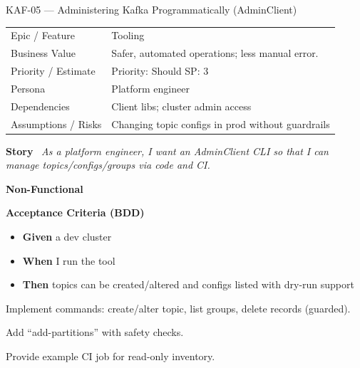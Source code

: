 \documentclass[11pt,a4paper]{article}
\newcommand{\Field}[2]{\textbf{#1}~#2}
\begin{document}
\begin{StoryCardBox}{KAF-05 --- Administering Kafka Programmatically (AdminClient)}
\begin{tabularx}{\linewidth}{LY}
 Epic / Feature & Tooling \\
 Business Value & Safer, automated operations; less manual error. \\
 Priority / Estimate & Priority: Should \quad SP: 3 \\
 Persona & Platform engineer \\
 Dependencies & Client libs; cluster admin access \\
 Assumptions / Risks & Changing topic configs in prod without guardrails \\
\end{tabularx}

\medskip
\Field{Story}{\; \emph{As a platform engineer, I want an AdminClient CLI so that I can manage topics/configs/groups via code and CI.}}

\medskip
\Field{Non-Functional}{\; \; }

\medskip
\Field{Acceptance Criteria (BDD)}{}
\begin{itemize}[leftmargin=1.2em, itemsep=1pt]
  \item \textbf{Given} a dev cluster
  \item \textbf{When} I run the tool
  \item \textbf{Then} topics can be created/altered and configs listed with dry-run support
\end{itemize}

\begin{TasksBox}
\begin{tasklist}
  \item Implement commands: create/alter topic, list groups, delete records (guarded).
  \item Add ``add-partitions'' with safety checks.
  \item Provide example CI job for read-only inventory.
\end{tasklist}
\end{TasksBox}
\end{StoryCardBox}
\clearpage
\end{document}
